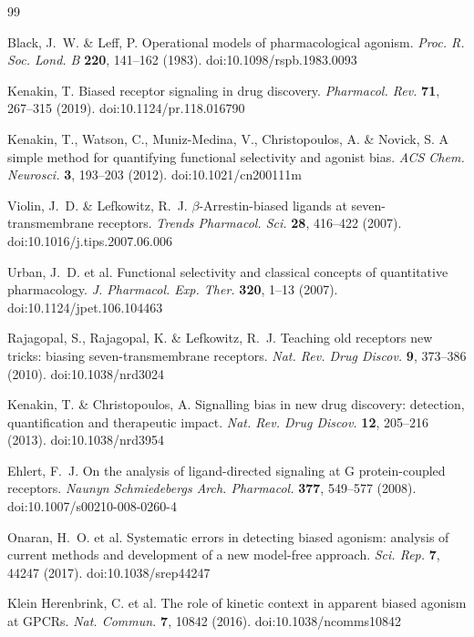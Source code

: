 ﻿\documentclass[11pt,a4paper]{article}
\begin{document}
\begin{thebibliography}{99}
\small

Black, J.~W. \& Leff, P. Operational models of pharmacological agonism. \emph{Proc. R. Soc. Lond. B} \textbf{220}, 141--162 (1983). doi:10.1098/rspb.1983.0093

Kenakin, T. Biased receptor signaling in drug discovery. \emph{Pharmacol. Rev.} \textbf{71}, 267--315 (2019). doi:10.1124/pr.118.016790

Kenakin, T., Watson, C., Muniz-Medina, V., Christopoulos, A. \& Novick, S. A simple method for quantifying functional selectivity and agonist bias. \emph{ACS Chem. Neurosci.} \textbf{3}, 193--203 (2012). doi:10.1021/cn200111m

Violin, J.~D. \& Lefkowitz, R.~J. $\beta$-Arrestin-biased ligands at seven-transmembrane receptors. \emph{Trends Pharmacol. Sci.} \textbf{28}, 416--422 (2007). doi:10.1016/j.tips.2007.06.006

Urban, J.~D. et al. Functional selectivity and classical concepts of quantitative pharmacology. \emph{J. Pharmacol. Exp. Ther.} \textbf{320}, 1--13 (2007). doi:10.1124/jpet.106.104463

Rajagopal, S., Rajagopal, K. \& Lefkowitz, R.~J. Teaching old receptors new tricks: biasing seven-transmembrane receptors. \emph{Nat. Rev. Drug Discov.} \textbf{9}, 373--386 (2010). doi:10.1038/nrd3024

Kenakin, T. \& Christopoulos, A. Signalling bias in new drug discovery: detection, quantification and therapeutic impact. \emph{Nat. Rev. Drug Discov.} \textbf{12}, 205--216 (2013). doi:10.1038/nrd3954

Ehlert, F.~J. On the analysis of ligand-directed signaling at G protein-coupled receptors. \emph{Naunyn Schmiedebergs Arch. Pharmacol.} \textbf{377}, 549--577 (2008). doi:10.1007/s00210-008-0260-4

Onaran, H.~O. et al. Systematic errors in detecting biased agonism: analysis of current methods and development of a new model-free approach. \emph{Sci. Rep.} \textbf{7}, 44247 (2017). doi:10.1038/srep44247

Klein Herenbrink, C. et al. The role of kinetic context in apparent biased agonism at GPCRs. \emph{Nat. Commun.} \textbf{7}, 10842 (2016). doi:10.1038/ncomms10842


\end{thebibliography}
\end{document}
